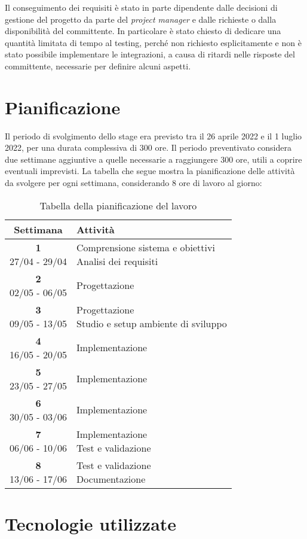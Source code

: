 \noindent Il conseguimento dei requisiti è stato in parte dipendente dalle decisioni di gestione del progetto da parte del \emph{project manager} e dalle richieste o dalla disponibilità del committente. In particolare è stato chiesto di dedicare una quantità limitata di tempo al testing, perché non richiesto esplicitamente e non è stato possibile implementare le integrazioni, a causa di ritardi nelle risposte del committente, necessarie per definire alcuni aspetti.


\section{Pianificazione}
Il periodo di svolgimento dello stage era previsto tra il 26 aprile 2022 e il 1 luglio 2022, per una durata complessiva di 300 ore. Il periodo preventivato considera due settimane aggiuntive a quelle necessarie a raggiungere 300 ore, utili a coprire eventuali imprevisti. La tabella che segue mostra la pianificazione delle attività da svolgere per ogni settimana, considerando 8 ore di lavoro al giorno:

\begin{table}[h]
	\centering
	\label{tab:pianificazione}
	\begin{tabularx}{0.65 \textwidth}{c|X}
		\rowcolor{white}
		\textbf{Settimana} & \textbf{Attività} \\
		\hline
		\makecell{\textbf{1} \\ 27/04 - 29/04} & \makecell[l]{Comprensione sistema e obiettivi \\ Analisi dei requisiti} \\
		\makecell{\textbf{2} \\ 02/05 - 06/05} & Progettazione \\
		\makecell{\textbf{3} \\ 09/05 - 13/05} & \makecell[l]{Progettazione \\ Studio e setup ambiente di sviluppo} \\
		\makecell{\textbf{4} \\ 16/05 - 20/05} & Implementazione \\
		\makecell{\textbf{5} \\ 23/05 - 27/05} & Implementazione \\
		\makecell{\textbf{6} \\ 30/05 - 03/06} & Implementazione \\
		\makecell{\textbf{7} \\ 06/06 - 10/06} & \makecell[l]{Implementazione \\ Test e validazione} \\
		\makecell{\textbf{8} \\ 13/06 - 17/06} & \makecell[l]{Test e validazione \\ Documentazione}
	\end{tabularx}
	\vspace{5pt}
	\caption{Tabella della pianificazione del lavoro}
\end{table}


\section{Tecnologie utilizzate}
